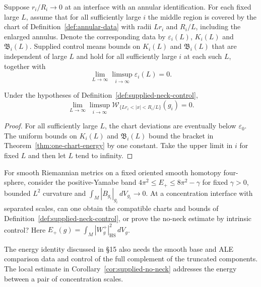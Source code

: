 \begin{definition}
\label{def:supplied-neck-control}
Suppose $r_i/R_i\to0$ at an interface with an annular identification.
For each fixed large $L$, assume that for all sufficiently large $i$
the middle region is covered by the chart of Definition~\ref{def:annular-data}
with radii $Lr_i$ and $R_i/L$, including the enlarged annulus.
Denote the corresponding data by $\varepsilon_i(L)$, $K_i(L)$ and
$\mathfrak B_i(L)$. Supplied control means bounds on $K_i(L)$ and
$\mathfrak B_i(L)$ that are independent of large $L$ and hold for all
sufficiently large $i$ at each such $L$, together with
\[
  \lim_{L\to\infty}\limsup_{i\to\infty}\varepsilon_i(L)=0 .
\]
\end{definition}

\begin{corollary}
\label{cor:supplied-no-neck}
Under the hypotheses of Definition~\ref{def:supplied-neck-control},
\[
  \lim_{L\to\infty}\limsup_{i\to\infty}
  \mathcal W_{\{Lr_i<|x|<R_i/L\}}(g_i)=0 .
\]
\end{corollary}

\begin{proof}
For all sufficiently large $L$, the chart deviations are eventually below
$\varepsilon_0$. The uniform bounds on $K_i(L)$ and $\mathfrak B_i(L)$
bound the bracket in Theorem~\ref{thm:one-chart-energy} by one constant.
Take the upper limit in $i$ for fixed $L$ and then let $L$ tend to infinity.
\end{proof}

\begin{openproblem}
\label{problem:almost-bach-flat-control}
\notready
For smooth Riemannian metrics on a fixed oriented smooth homotopy
four-sphere, consider the positive-Yamabe band
$4\pi^2\le E_+\le8\pi^2-\gamma$
for fixed $\gamma>0$, bounded $L^2$ curvature and
$\int_M|B_{g_i}|_{g_i}\,dV_{g_i}\to0$. At a concentration interface
with separated scales, can one obtain the compatible charts and
bounds of Definition~\ref{def:supplied-neck-control}, or prove the
no-neck estimate by intrinsic control? Here
$E_+(g)=\int_M |W_g^+|_{\mathrm{HS}}^2\,dV_g$.
\end{openproblem}

The energy identity discussed in \S15 also needs the smooth base and ALE
comparison data and control of the full complement of the truncated
components. The local estimate in Corollary~\ref{cor:supplied-no-neck}
addresses the energy between a pair of concentration scales.

















